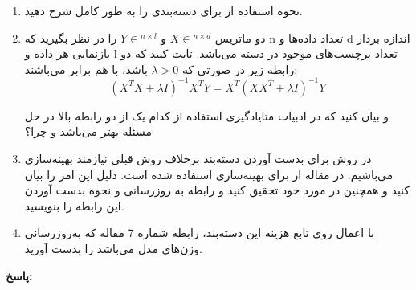 \documentclass{article}
\begin{document}
\begin{enumerate}
	\item
	نحوه استفاده از 
	برای دسته‌بندی را به طور کامل شرح دهید.
	\item
	دو ماتریس
	$X \in {^{n \times d}}$
	و
	$Y \in {^{n \times l}}$
	را در نظر بگیرید که n تعداد داده‌ها و d اندازه بردار باز‌نمایی هر داده و l تعداد برچسب‌های موجود در دسته می‌باشد. ثایت کنید که دو رابطه زیر در صورتی که
	$\lambda  > 0$
	باشد، با هم برابر می‌باشند:
	$$
	{\left( {{X^T}X + \lambda I} \right)^{ - 1}}{X^T}Y = {X^T}{\left( {X{X^T} + \lambda I} \right)^{ - 1}}Y
	$$
	
	و بیان کنید که در ادبیات متایادگیری استفاده از کدام یک از دو رابطه بالا در حل مسئله بهتر می‌باشد و چرا؟
	\\
	
	\item
	در روش
	برای بدست آوردن دسته‌بند برخلاف روش قبلی نیازمند بهینه‌سازی می‌باشیم. در مقاله از
	برای بهینه‌سازی استفاده شده است. دلیل این امر را بیان کنید و همچنین در مورد خود
	تحقیق کنید و رابطه به روزرسانی و نحوه بدست آوردن این رابطه را بنویسید.
	
	\item
	با اعمال
	روی تابع هزینه این دسته‌بند، رابطه شماره 7 مقاله که به‌روزرسانی وزن‌های مدل می‌باشد را بدست آورید.


\end{enumerate}


\textbf{پاسخ:}
\end{document}
